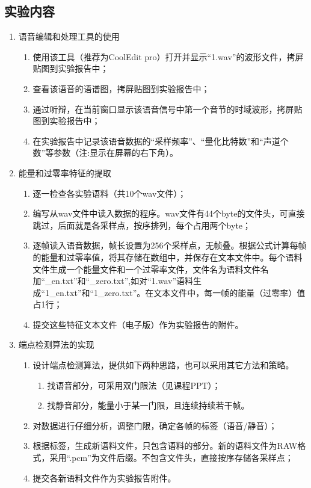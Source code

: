 \documentclass{hitreport}
\begin{document}
\subsection{实验内容}
\begin{enumerate}
\item 语音编辑和处理工具的使用
\begin{enumerate}
\item 使用该工具（推荐为CoolEdit pro）打开并显示“1.wav”的波形文件，拷屏贴图到实验报告中；
\item 查看该语音的语谱图，拷屏贴图到实验报告中；
\item 通过听辩，在当前窗口显示该语音信号中第一个音节的时域波形，拷屏贴图到实验报告中；
\item 在实验报告中记录该语音数据的“采样频率”、“量化比特数”和“声道个数”等参数（注:显示在屏幕的右下角）。
\end{enumerate}

\item 能量和过零率特征的提取
\begin{enumerate}
\item 逐一检查各实验语料（共10个wav文件）；
\item 编写从wav文件中读入数据的程序。wav文件有44个byte的文件头，可直接跳过，后面就是各采样点，按序排列，每个占用两个byte；
\item 逐帧读入语音数据，帧长设置为256个采样点，无帧叠。根据公式计算每帧的能量和过零率值，将其存储在数组中，并保存在文本文件中。每个语料文件生成一个能量文件和一个过零率文件，文件名为语料文件名加“\_en.txt”和“\_zero.txt”,如对“1.wav”语料生成“1\_en.txt”和“1\_zero.txt”。在文本文件中，每一帧的能量（过零率）值占1行；
\item 提交这些特征文本文件（电子版）作为实验报告的附件。
\end{enumerate}

\item 端点检测算法的实现
\begin{enumerate}
\item 设计端点检测算法，提供如下两种思路，也可以采用其它方法和策略。
\begin{enumerate}
\item 找语音部分，可采用双门限法（见课程PPT）；
\item 找静音部分，能量小于某一门限，且连续持续若干帧。
\end{enumerate}
\item 对数据进行仔细分析，调整门限，确定各帧的标签（语音/静音）；
\item 根据标签，生成新语料文件，只包含语料的部分。新的语料文件为RAW格式，采用“.pcm”为文件后缀。不包含文件头，直接按序存储各采样点；
\item 提交各新语料文件作为实验报告附件。


\end{enumerate}
\end{enumerate}
\end{document}
